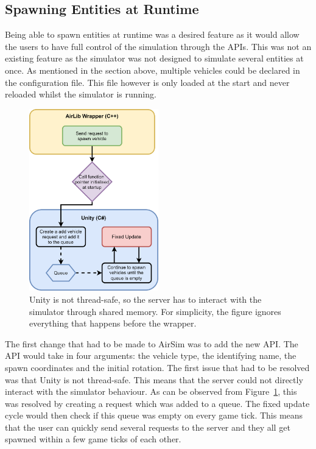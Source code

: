 \subsection{Spawning Entities at Runtime}





Being able to spawn entities at runtime was a desired feature as it would allow the users to have full control of the simulation through the APIs. This was not an existing feature as the simulator was not designed to simulate several entities at once. As mentioned in the section above, multiple vehicles could be declared in the configuration file. This file however is only loaded at the start and never reloaded whilst the simulator is running. 

\begin{figure}
    \includegraphics[width=0.5\textwidth]{06_Implementation/00_AirSim/Diagrams/spawnVehicle.png}
    \caption{Unity is not thread-safe, so the server has to interact with the simulator through shared memory. For simplicity, the figure ignores everything that happens before the wrapper.} \label{06:spawnVehicle}
\end{figure}

The first change that had to be made to AirSim was to add the new API. The API would take in four arguments: the vehicle type, the identifying name, the spawn coordinates and the initial rotation. The first issue that had to be resolved was that Unity is not thread-safe. This means that the server could not directly interact with the simulator behaviour. As can be observed from Figure~\ref{06:spawnVehicle}, this was resolved by creating a request which was added to a queue. The fixed update cycle would then check if this queue was empty on every game tick. This means that the user can quickly send several requests to the server and they all get spawned within a few game ticks of each other. 

